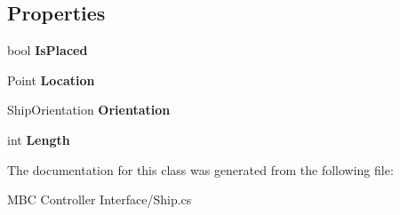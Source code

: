 \subsection*{Properties}
\begin{DoxyCompactItemize}
\item 
\hypertarget{class_m_b_c_1_1_core_1_1_ship_a9a7f4e721f2d4cd9391e2bc633d3ceb2}{bool {\bfseries Is\-Placed}}\label{class_m_b_c_1_1_core_1_1_ship_a9a7f4e721f2d4cd9391e2bc633d3ceb2}

\item 
\hypertarget{class_m_b_c_1_1_core_1_1_ship_ac2b6713dd5e22c092ec5f772379d1c78}{Point {\bfseries Location}}\label{class_m_b_c_1_1_core_1_1_ship_ac2b6713dd5e22c092ec5f772379d1c78}

\item 
\hypertarget{class_m_b_c_1_1_core_1_1_ship_afcd2ca11e40556c99330a4aa0821244a}{Ship\-Orientation {\bfseries Orientation}}\label{class_m_b_c_1_1_core_1_1_ship_afcd2ca11e40556c99330a4aa0821244a}

\item 
\hypertarget{class_m_b_c_1_1_core_1_1_ship_a032a96397bef51321cec9d2ec370ffca}{int {\bfseries Length}}\label{class_m_b_c_1_1_core_1_1_ship_a032a96397bef51321cec9d2ec370ffca}

\end{DoxyCompactItemize}


The documentation for this class was generated from the following file\-:\begin{DoxyCompactItemize}
\item 
M\-B\-C Controller Interface/Ship.\-cs\end{DoxyCompactItemize}
